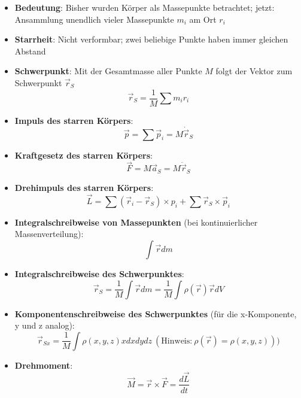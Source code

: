 \begin{itemize}
	\item \textbf{Bedeutung}: Bisher wurden Körper als Massepunkte betrachtet; jetzt: Ansammlung unendlich vieler Massepunkte $m_i$ am Ort $r_i$
	\item \textbf{Starrheit}: Nicht verformbar; zwei beliebige Punkte haben immer gleichen Abstand
	\item \textbf{Schwerpunkt}: Mit der Gesamtmasse aller Punkte $M$ folgt der Vektor zum Schwerpunkt $\vec{r}_S$
	\begin{equation}
		\vec{r}_S = \frac{1}{M}\sum m_ir_i
	\end{equation}
	\item \textbf{Impuls des starren Körpers}:
	\begin{equation}
		\vec{p} = \sum \vec{p}_i = M \dot{\vec{r}}_S
	\end{equation}
	\item \textbf{Kraftgesetz des starren Körpers}:
	\begin{equation}
		\vec{F} = M\vec{a}_S = M\ddot{\vec{r}}_S
	\end{equation}
	\item \textbf{Drehimpuls des starren Körpers}:
	\begin{equation}
		\vec{L} = \sum (\vec{r}_i - \vec{r}_S) \times p_i + \sum \vec{r}_S \times \vec{p}_i
	\end{equation}
	\item \textbf{Integralschreibweise von Massepunkten} (bei kontinuierlicher Massenverteilung):
	\begin{equation}
		\int \vec{r}dm
	\end{equation}
	\item \textbf{Integralschreibweise des Schwerpunktes}:
	\begin{equation}
		\vec{r}_S = \frac{1}{M}\int \vec{r}dm = \frac{1}{M} \int \rho(\vec{r})\vec{r}dV
	\end{equation}
	\item \textbf{Komponentenschreibweise des Schwerpunktes} (für die x-Komponente, y und z analog):
	\begin{equation}
		\vec{r}_{Sx} = \frac{1}{M} \int \rho(x, y, z)xdxdydz\ (\text{Hinweis:}\ \rho(\vec{r}) = \rho(x, y, z)))
	\end{equation}
	\item \textbf{Drehmoment}:
	\begin{equation}
		\vec{M} = \vec{r} \times \vec{F} = \frac{d\vec{L}}{dt}
	\end{equation}

\end{itemize}
